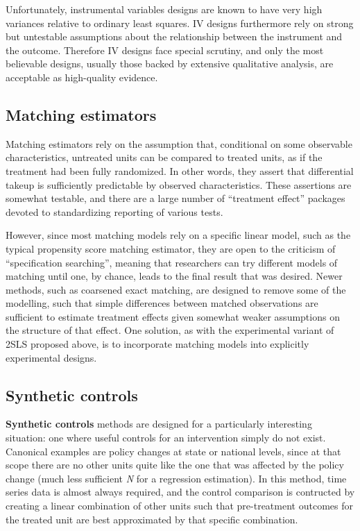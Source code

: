 Unfortunately, instrumental variables designs are known
to have very high variances relative to ordinary least squares.\cite{young2017consistency}
IV designs furthermore rely on strong but untestable assumptions
about the relationship between the instrument and the outcome.\cite{bound1995problems}
Therefore IV designs face special scrutiny,
and only the most believable designs,
usually those backed by extensive qualitative analysis,
are acceptable as high-quality evidence.

\subsection{Matching estimators}

Matching estimators rely on the assumption that,
conditional on some observable characteristics,
untreated units can be compared to treated units,
as if the treatment had been fully randomized.
In other words, they assert that differential takeup
is sufficiently predictable by observed characteristics.
These assertions are somewhat testable,
and there are a large number of ``treatment effect''
packages devoted to standardizing reporting of various tests.

However, since most matching models rely on a specific linear model,
such as the typical propensity score matching estimator,
they are open to the criticism of ``specification searching'',
meaning that researchers can try different models of matching
until one, by chance, leads to the final result that was desired.
Newer methods, such as coarsened exact matching\cite{iacus2012causal},
are designed to remove some of the modelling,
such that simple differences between matched observations
are sufficient to estimate treatment effects
given somewhat weaker assumptions on the structure of that effect.
One solution, as with the experimental variant of 2SLS proposed above,
is to incorporate matching models into explicitly experimental designs.

\subsection{Synthetic controls}

\textbf{Synthetic controls} methods\cite{abadie2015comparative}
are designed for a particularly interesting situation:
one where useful controls for an intervention simply do not exist.
Canonical examples are policy changes at state or national levels,
since at that scope there are no other units quite like
the one that was affected by the policy change
(much less sufficient \textit{N} for a regression estimation).\cite{gobillon2016regional}
In this method, time series data is almost always required,
and the control comparison is contructed by creating
a linear combination of other units such that pre-treatment outcomes
for the treated unit are best approximated by that specific combination.
